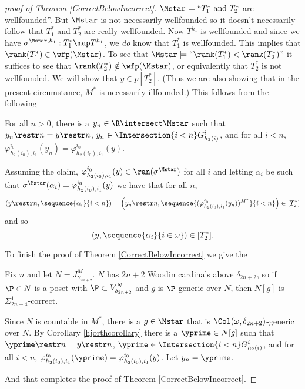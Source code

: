 \documentclass[oneside,12pt]{amsart}
\begin{document}
\begin{proof}[proof of Theorem \ref{CorrectBelowIncorrect}]
$\Mstar\models \text{``}T_1^* \text{ and } T_2^*$ are wellfounded''. But $\Mstar$ is not
necessarily wellfounded so it doesn't necessarily follow that $T_1^*$ and $T_2^*$ are really wellfounded.
Now $T^{h_1}$ is wellfounded and since we have $\sigma^{\Mstar,h_1}:T_1^*\map T^{h_1}$,
we \emph{do} know that $T_1^*$ is wellfounded. This implies that
$\rank(T_1^*)\in\wfp(\Mstar)$.
To see that $\Mstar\models\text{``}\rank(T_1^*) < \rank(T_2^*)$'' it suffices to
see that $\rank(T_2^*)\notin\wfp(\Mstar)$, or equivalently that $T_2^*$ is not wellfounded.
We will show that $y\in p[T_2^*]$. (Thus we are also showing that in the present
circumstance, $M^*$ is necessarily illfounded.)
This follows from the following

\begin{claim}
For all $n>0$, there is a $y_n\in \R\intersect\Mstar$ such that $y_n\restr n = y \restr n$,
$y_n \in  \Intersection{i<n} G^i_{h_2(i)}$,
and for all $i < n$, $\varphi^{i_0}_{h_2(i_0),i_1}(y_n) = \varphi^{i_0}_{h_2(i_0),i_1}(y)$.
\end{claim}

Assuming the claim, $\varphi^{i_0}_{h_2(i_0),i_1}(y)\in\ran(\sigma^{\Mstar})$ for all $i$
and letting $\alpha_i$ be such that $\sigma^{\Mstar}(\alpha_i)=\varphi^{i_0}_{h_2(i_0),i_1}(y)$
we have that for all $n$,
$$\left(y\restr n, \sequence{\alpha_i}{i<n} \right)=
\left(y_n\restr n, \sequence{(\varphi^{i_0}_{h_2(i_0),i_1}(y_n))^{M^*}}{i<n} \right)\in[T^*_2]$$
and so
$$\left(y, \sequence{\alpha_i}{i\in\omega} \right)\in[T^*_2].$$

To finish the proof of Theorem \ref{CorrectBelowIncorrect} we give the

\begin{subproof}
Fix $n$ and let $N=J^M_{\gamma_{2n+2}}$. $N$ has $2n+2$ Woodin cardinals above $\delta_{2n+2}$,
so if $\P\in N$ is a poset with $\P\subset V^N_{\delta_{2n+2}}$ and $g$ is $\P$-generic over $N$, then $N[g]$
is $\Sigma^1_{2n+4}$-correct.

Since $N$ is countable in $M^*$, there is a $g\in\Mstar$ that is
$\Col(\omega,\delta_{2n+2})$-generic over $N$. By Corollary \ref{hjorthcorollary}
there is a $\yprime\in N[g]$ such that
$\yprime\restr n = y \restr n$,
$\yprime \in  \Intersection{i<n} G^i_{h_2(i)}$,
and for all $i < n$, $\varphi^{i_0}_{h_2(i_0),i_1}(\yprime) = \varphi^{i_0}_{h_2(i_0),i_1}(y)$.
Let $y_n=\yprime$.

\end{subproof}

And that completes the proof of Theorem \ref{CorrectBelowIncorrect}.

\end{proof}
\end{document}
